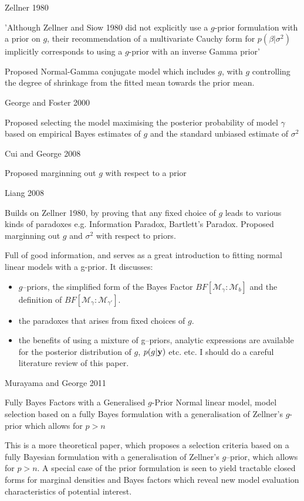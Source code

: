 \documentclass{amsart}[12pt]
\begin{document}
Zellner 1980

'Although Zellner and Siow 1980 did not explicitly use a $g$-prior formulation with a prior on $g$,
their recommendation of a multivariate Cauchy form for $p(\beta|\sigma^2)$ implicitly corresponds to using a
$g$-prior with an inverse Gamma prior'

Proposed Normal-Gamma conjugate model which includes $g$, with $g$ controlling the degree of shrinkage
from the fitted mean towards the prior mean.

George and Foster 2000

Proposed selecting the model maximising the posterior probability of model $\gamma$ based on empirical
Bayes estimates of $g$ and the standard unbiased estimate of $\sigma^2$

Cui and George 2008

Proposed marginning out $g$ with respect to a prior

Liang 2008

Builds on Zellner 1980, by proving that any fixed choice of $g$ leads to various kinds of paradoxes e.g.
Information Paradox, Bartlett's Paradox.
Proposed marginning out $g$ and $\sigma^2$ with respect to priors.

Full of good information, and serves as a great introduction to fitting normal linear models with a g-prior.
It discusses:
\begin{itemize}
\item $g$--priors, the simplified form of the Bayes Factor $BF[\mathcal{M}_\gamma : \mathcal{M}_b]$ and the definition of $BF[\mathcal{M}_\gamma : \mathcal{M}_{\gamma'}]$.
\item the paradoxes that arises from fixed choices of $g$.
\item the benefits of using a mixture of g--priors, analytic expressions are available for the posterior
distribution of $g$, $p(g|{\bf y})$ etc. etc. I should do a careful literature review of this paper.
\end{itemize}

Murayama and George 2011

Fully Bayes Factors with a Generalised $g$-Prior
Normal linear model, model selection based on a fully Bayes formulation with a generalisation of Zellner's
$g$-prior which allows for $p > n$

This is a more theoretical paper, which proposes a selection criteria based on a fully Bayesian formulation
with a generalisation of Zellner's $g$--prior, which allows for $p > n$. A special case of the prior
formulation is seen to yield tractable closed forms for marginal densities and Bayes factors which reveal new
model evaluation characteristics of potential interest.
\end{document}
